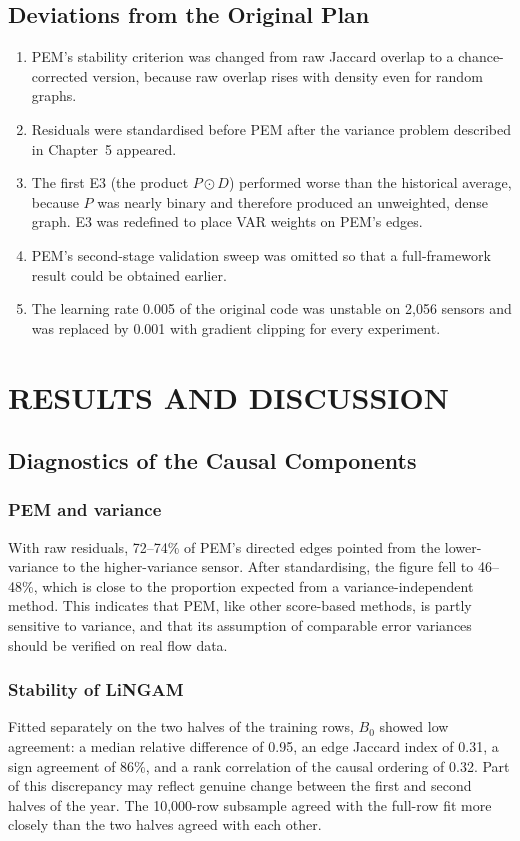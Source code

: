 \documentclass[MTech]{ugthesis}
\begin{document}
\section{Deviations from the Original Plan}
\label{sec:amend}
\begin{enumerate}
\item PEM's stability criterion was changed from raw Jaccard overlap to a chance-corrected version, because raw overlap rises with density even for random graphs.
\item Residuals were standardised before PEM after the variance problem described in Chapter~5 appeared.
\item The first E3 (the product $P\odot D$) performed worse than the historical average, because $P$ was nearly binary and therefore produced an unweighted, dense graph. E3 was redefined to place VAR weights on PEM's edges.
\item PEM's second-stage validation sweep was omitted so that a full-framework result could be obtained earlier.
\item The learning rate 0.005 of the original code was unstable on 2,056 sensors and was replaced by 0.001 with gradient clipping for every experiment.
\end{enumerate}

\chapter{RESULTS AND DISCUSSION}

\section{Diagnostics of the Causal Components}

\subsection{PEM and variance}
With raw residuals, 72--74\% of PEM's directed edges pointed from the lower-variance to the higher-variance sensor. After standardising, the figure fell to 46--48\%, which is close to the proportion expected from a variance-independent method. This indicates that PEM, like other score-based methods, is partly sensitive to variance, and that its assumption of comparable error variances should be verified on real flow data.

\subsection{Stability of LiNGAM}
Fitted separately on the two halves of the training rows, $B_0$ showed low agreement: a median relative difference of 0.95, an edge Jaccard index of 0.31, a sign agreement of 86\%, and a rank correlation of the causal ordering of 0.32. Part of this discrepancy may reflect genuine change between the first and second halves of the year. The 10,000-row subsample agreed with the full-row fit more closely than the two halves agreed with each other.
\end{document}
